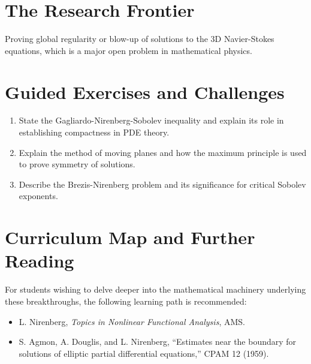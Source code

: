 \section{The Research Frontier}
Proving global regularity or blow-up of solutions to the 3D Navier-Stokes equations, which is a major open problem in mathematical physics.

\section{Guided Exercises and Challenges}
\begin{enumerate}[label=\textbf{\arabic*.}]
  \item State the Gagliardo-Nirenberg-Sobolev inequality and explain its role in establishing compactness in PDE theory.
  \item Explain the method of moving planes and how the maximum principle is used to prove symmetry of solutions.
  \item Describe the Brezis-Nirenberg problem and its significance for critical Sobolev exponents.
\end{enumerate}

\section{Curriculum Map and Further Reading}
For students wishing to delve deeper into the mathematical machinery underlying these breakthroughs, the following learning path is recommended:
\begin{itemize}
  \item L. Nirenberg, \emph{Topics in Nonlinear Functional Analysis}, AMS.
  \item S. Agmon, A. Douglis, and L. Nirenberg, ``Estimates near the boundary for solutions of elliptic partial differential equations,'' CPAM 12 (1959).
\end{itemize}

